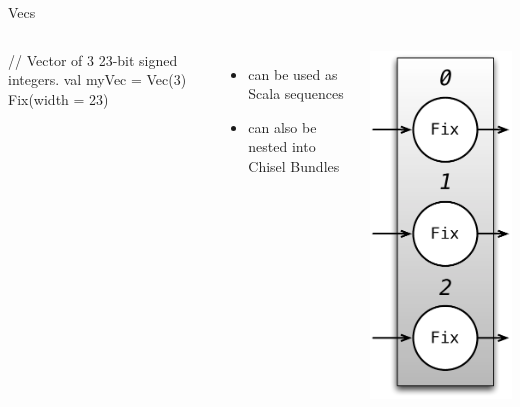 \documentclass[xcolor=pdflatex,dvipsnames,table]{beamer}
\begin{document}
\begin{frame}[fragile]{Vecs}
\begin{columns}

\begin{scala}
// Vector of 3 23-bit signed integers.
val myVec = Vec(3) { Fix(width = 23) } 
\end{scala}

\begin{itemize}
\item can be used as Scala sequences
\item can also be nested into Chisel Bundles
\end{itemize}


\begin{center}
\includegraphics[height=0.9\textheight]{figs/vec-3-fix.pdf} 
\end{center}

\end{columns}
\end{frame}
\end{document}

